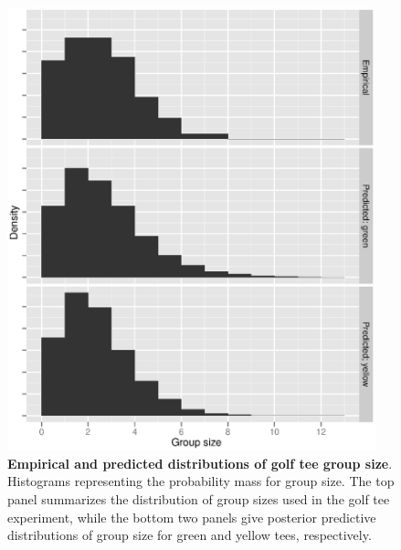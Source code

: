 \documentclass[10pt]{article}
\begin{document}
\begin{figure}
\begin{center}
\includegraphics[width=0.95\textwidth]{golf_tee_grp_size.eps}
\end{center}
\caption{{\bf Empirical and predicted distributions of golf tee group size}. Histograms representing the probability mass for group size.  The top panel summarizes the distribution of group
sizes used in the golf tee experiment, while the bottom two panels give posterior predictive distributions of group size for green and yellow tees, respectively.   }
\label{fig:tee_group}
\end{figure}
\clearpage
\end{document}
